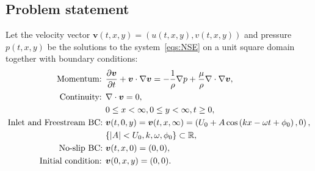 \documentclass{article}
\begin{document}
\subsection{Problem statement}
Let the velocity vector $\boldsymbol{v}(t,x,y)=(u(t,x,y),v(t,x,y))$ and pressure $p(t,x,y)$ be the solutions to the system~\eqref{eqs:NSE} on a unit square domain together with boundary conditions:
\begin{subequations}
\label{eqs:NSE-dsm-bl-dimensional}
\begin{align}
\label{eqn:momentum-dimensional}
\text{Momentum: }	&\frac{\partial \boldsymbol{v}}{\partial t} + \boldsymbol{v} \cdot \nabla \boldsymbol{v} = -\frac{1}{\rho}\nabla p + {\frac{\mu}{\rho}} \nabla \cdot \nabla \boldsymbol{v},\\
\label{eqn:continuity-dsm-bl}
\text{Continuity: }	& \nabla \cdot \boldsymbol{v} = 0, \\ 
					&0\leq x < \infty, 0\leq y <\infty, t\geq0,\notag\\
\label{eqn:NSE-dsm-bl-bc-freestream}
\text{Inlet and Freestream BC: } 	& \boldsymbol{v}(t,0,y)=\boldsymbol{v}(t,x,\infty)=\left(U_0 + A\cos\left( kx -\omega t + \phi_0 \right),0\right),\\
									& \{|A|<U_0,k,\omega, \phi_0\}\subset \mathbb{R},\notag\\
\label{eqn:NSE-dsm-bl-bc-noslip}
\text{No-slip BC: } & \boldsymbol{v}(t,x,0)=(0,0), \\
\text{Initial condition: } &\boldsymbol{v}(0,x,y)=(0,0).
\end{align}
\end{subequations}
\end{document}
